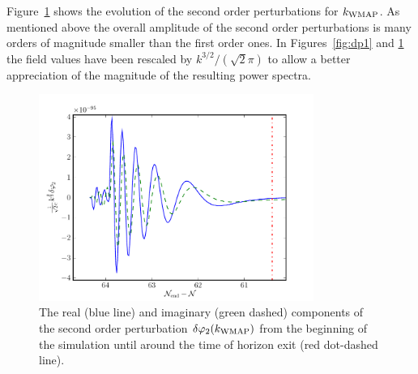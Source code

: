 Figure~\ref{fig:dp2realimag} shows the evolution of the second
order perturbations for $k_\mathrm{WMAP}$. As mentioned above the
overall amplitude of the second order perturbations is many orders of
magnitude smaller than the first order ones. In Figures~\ref{fig:dp1}
and \ref{fig:dp2realimag} the field values have been rescaled by
$k^{3/2}/(\sqrt{2}\pi)$ to allow a better appreciation of the
magnitude of the resulting power spectra.
% 
\begin{figure}
 \centering
 \includegraphics[width=0.8\textwidth]{numerical/graphs/dp2_kwmap}
 \caption[Second Order Perturbation]{The real (blue line) and imaginary (green
dashed) components of the
second order
perturbation $\delta\varphi_{2}(k_\mathrm{WMAP})$ from the beginning of the simulation until around
the time
of horizon exit (red dot-dashed line).}
\label{fig:dp2realimag}
\end{figure}
% 



